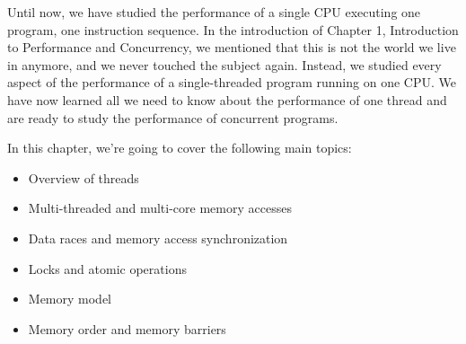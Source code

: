 Until now, we have studied the performance of a single CPU executing one program, one instruction sequence. In the introduction of Chapter 1, Introduction to Performance and Concurrency, we mentioned that this is not the world we live in anymore, and we never touched the subject again. Instead, we studied every aspect of the performance of a single-threaded program running on one CPU. We have now learned all we need to know about the performance of one thread and are ready to study the performance of concurrent programs.

In this chapter, we're going to cover the following main topics:

\begin{itemize}
\item Overview of threads
\item Multi-threaded and multi-core memory accesses
\item Data races and memory access synchronization
\item Locks and atomic operations
\item Memory model
\item Memory order and memory barriers
\end{itemize}
